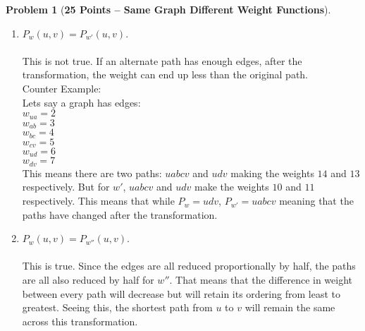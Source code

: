 \documentclass[11pt]{article}
\theoremstyle{definition}
\theoremstyle{theorem}
\newtheorem{prob}{Problem}
\begin{document}
\begin{prob}[\textbf{25 Points -- Same Graph Different Weight Functions}]
\begin{enumerate}
\begin{enumerate}
\item $P_{w}(u,v) = P_{w'}(u,v)$. \\\\
This is not true. If an alternate path has enough edges, after the transformation, the weight can end up less than the original path. \\
Counter Example: \\
Lets say a graph has edges: \\
$w_{ua}=2$ \\
$w_{ab}=3$ \\
$w_{bc}=4$ \\
$w_{cv}=5$ \\
$w_{ud}=6$ \\
$w_{dv}=7$ \\
This means there are two paths: $uabcv$ and $udv$ making the weights $14$ and $13$ respectively. But for $w'$, $uabcv$ and $udv$ make the weights $10$ and $11$ respectively. This means that while $P_{w}=udv$, $P_{w'}=uabcv$ meaning that the paths have changed after the transformation.
\item $P_{w}(u,v) = P_{w''}(u,v)$. \\\\
This is true. Since the edges are all reduced proportionally by half, the paths are all also reduced by half for $w''$. That means that the difference in weight between every path will decrease but will retain its ordering from least to greatest. Seeing this, the shortest path from $u$ to $v$ will remain the same across this transformation.
\end{enumerate}
\end{enumerate}
\end{prob}

\clearpage
\end{document}
